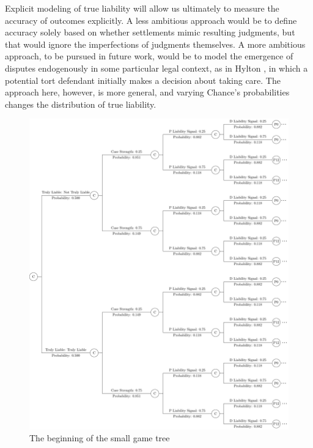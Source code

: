 \documentclass{article}
\begin{document}
Explicit modeling of true liability will allow us ultimately to measure the accuracy of outcomes explicitly. A less ambitious approach would be to define accuracy solely based on whether settlements mimic resulting judgments, but that would ignore the imperfections of judgments themselves. A more ambitious approach, to be pursued in future work, would be to model the emergence of disputes endogenously in some particular legal context, as in Hylton \cite{hylton}, in which a potential tort defendant initially makes a decision about taking care. The approach here, however, is more general, and varying Chance's probabilities changes the distribution of true liability. 

\begin{figure}[h!]
\centering
\includegraphics[scale=0.25, trim={0in 0in 0in 0in}, clip]{../Figures/game tree 2x2x2 beginning.pdf}
\caption{The beginning of the small game tree}
\label{fig:gametree2x2x2beginning}
\end{figure}
\end{document}
